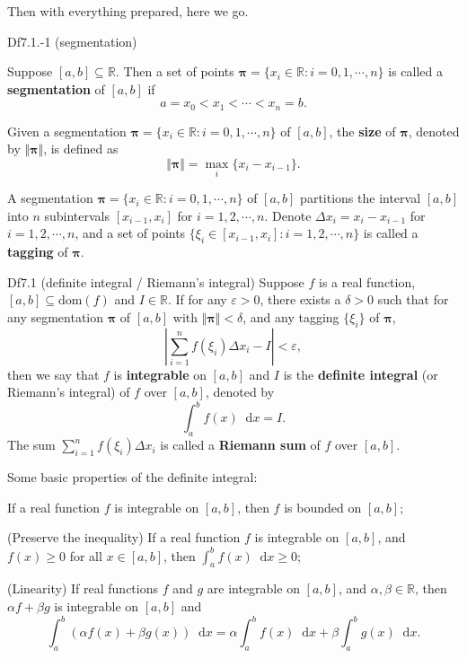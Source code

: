 \documentclass{article}
\newcommand{\dif}{\mathop{}\!\mathrm{d}}
\begin{document}
Then with everything prepared, here we go. 

\begin{Df}{Df7.1.-1 (segmentation)}
    \begin{compactenum}
        \item Suppose $[a, b]\subseteq\mathbb{R}$. Then a set of points $\pmb{\pi} = \{x_i\in\mathbb{R}: i = 0,1,\cdots,n\}$ is called a \textbf{segmentation} of $[a, b]$ if
            $$a = x_0 < x_1 < \cdots < x_n = b.$$ 
        \item Given a segmentation $\pmb{\pi} = \{x_i\in\mathbb{R}: i = 0,1,\cdots,n\}$ of $[a, b]$, the \textbf{size} of $\pmb{\pi}$, denoted by $\Vert \pmb{\pi}\Vert$, is defined as
            $$ \Vert \pmb{\pi}\Vert = \max_i\{x_i - x_{i-1}\}. $$
        \item A segmentation $\pmb{\pi} = \{x_i\in\mathbb{R}: i = 0,1,\cdots,n\}$ of $[a, b]$ partitions the interval $[a, b]$ into $n$ subintervals $[x_{i-1}, x_i]$ for $i = 1,2,\cdots,n$. Denote $\Delta x_i = x_i - x_{i-1}$ for $i = 1,2,\cdots,n$, and a set of points $\{\xi_i\in[x_{i-1}, x_i]: i = 1,2,\cdots,n\}$ is called a \textbf{tagging} of $\pmb{\pi}$.
    \end{compactenum}
\end{Df}

\begin{Df}{Df7.1 (definite integral / Riemann's integral)}
    Suppose $f$ is a real function, $[a, b]\subseteq \text{dom}(f)$ and $I\in\mathbb{R}$. If for any $\varepsilon>0$, there exists a $\delta>0$ such that for any segmentation $\pmb{\pi}$ of $[a, b]$ with $\Vert \pmb{\pi}\Vert < \delta$, and any tagging $\{\xi_i\}$ of $\pmb{\pi}$, 
    $$\left| \sum_{i=1}^n f(\xi_i)\Delta x_i - I \right| < \varepsilon,$$
    then we say that $f$ is \textbf{integrable} on $[a, b]$ and $I$ is the \textbf{definite integral} (or Riemann's integral) of $f$ over $[a, b]$, denoted by
    $$\int_a^b f(x)\dif x = I.$$
    The sum $\sum_{i=1}^n f(\xi_i)\Delta x_i$ is called a \textbf{Riemann sum} of $f$ over $[a, b]$.
\end{Df}

\begin{Rmk}{}
    Some basic properties of the definite integral:
    \begin{compactenum}
        \item If a real function $f$ is integrable on $[a, b]$, then $f$ is bounded on $[a, b]$;
        \item (Preserve the inequality) If a real function $f$ is integrable on $[a, b]$, and $f(x)\geq 0$ for all $x\in[a, b]$, then $\int_a^b f(x)\dif x \geq 0$;
        \item (Linearity) If real functions $f$ and $g$ are integrable on $[a, b]$, and $\alpha, \beta\in\mathbb{R}$, then $\alpha f + \beta g$ is integrable on $[a, b]$ and
            $$\int_a^b \left(\alpha f(x) + \beta g(x)\right)\dif x = \alpha\int_a^b f(x)\dif x + \beta\int_a^b g(x)\dif x.$$
    \end{compactenum}
\end{Rmk}
\end{document}
